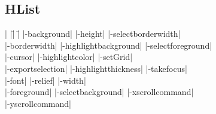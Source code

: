\subsection*{HList}
\begin{tabbing}
|                    |\=|                    |\= \kill                    
|-background|        \> |-height|             \> |-selectborderwidth| \\
|-borderwidth|       \> |-highlightbackground| \> |-selectforeground| \\
|-cursor|	     \> |-highlightcolor|     \> |-setGrid| \\         
|-exportselection|   \> |-highlightthickness| \> |-takefocus| \\
|-font|              \> |-relief|             \> |-width| \\           
|-foreground|        \> |-selectbackground|   \> |-xscrollcommand| \\  
\> \> |-yscrollcommand| \\  
\end{tabbing}

\vskip5pt

